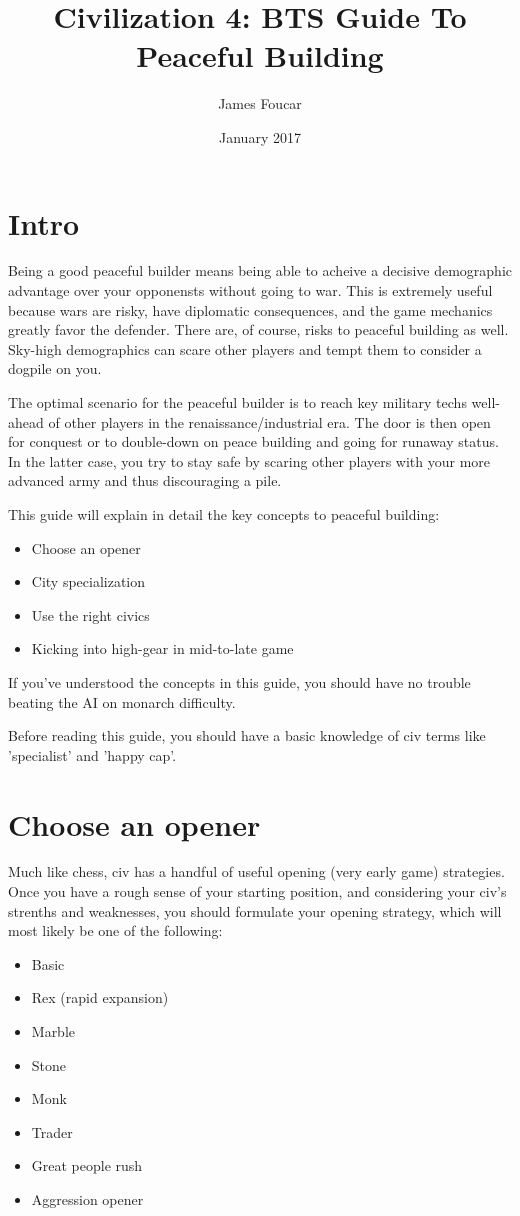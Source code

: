 \documentclass[10pt]{article}
\title{Civilization 4: BTS Guide To Peaceful Building}
\author{James Foucar}
\date{January 2017}
\begin{document}
\section*{Intro}

Being a good peaceful builder means being able to acheive a decisive demographic advantage
over your opponensts without going to war. This is extremely useful because wars are risky, have
diplomatic consequences, and the game mechanics greatly favor the defender. There are, of course,
risks to peaceful building as well. Sky-high demographics can scare other players and tempt them
to consider a dogpile on you.

The optimal scenario for the peaceful builder is to reach key military
techs well-ahead of other players in the renaissance/industrial era. The door is then open for conquest
or to double-down on peace building and going for runaway status. In the latter case, you try to stay
safe by scaring other players with your more advanced army and thus discouraging a pile.

This guide will explain in detail the key concepts to peaceful building:
\begin{itemize}
\item Choose an opener
\item City specialization
\item Use the right civics
\item Kicking into high-gear in mid-to-late game
\end{itemize}

If you've understood the concepts in this guide, you should have no trouble beating the AI
on monarch difficulty.

Before reading this guide, you should have a basic knowledge of civ terms like 'specialist'
and 'happy cap'.

\section*{Choose an opener}

Much like chess, civ has a handful of useful opening (very early game) strategies. Once you
have a rough sense of your starting position, and considering your civ's strenths and weaknesses,
you should formulate your opening strategy, which will most likely be one of the following:
\begin{itemize}
\item Basic
\item Rex (rapid expansion)
\item Marble
\item Stone
\item Monk
\item Trader
\item Great people rush
\item Aggression opener
\end{itemize}
\end{document}

